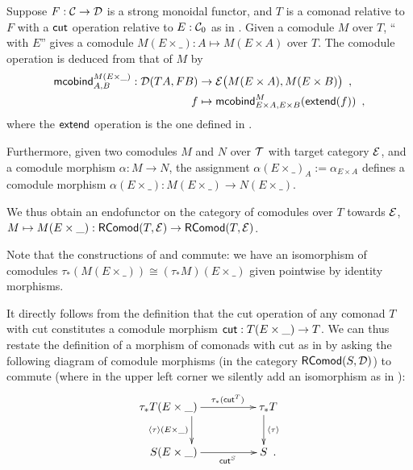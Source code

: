 \documentclass[envcountsame]{llncs}
\begin{document}
\begin{definition}%
\label{def:product_in_context}
 Suppose $F:{\mathcal{C}}\to\mathcal{D}$ is a strong monoidal functor, and $T$ is a comonad relative to $F$ with a $\mathsf{cut}$ operation 
 relative to $E:{\mathcal{C}}_0$ as in .
 Given a comodule $M$ over $T$,   \enquote{ with $E$}
 gives a comodule $M(E\times\_) : A \mapsto M(E\times A) $ over $T$.
 The comodule operation is deduced from that of $M$ by 
 \begin{align*} \mathsf{mcobind}^{M(E\times\_)}_{A,B} : \mathcal{D}(TA,FB)&\to \mathcal{E}\bigl(M(E\times A), M(E\times B)\bigr) \enspace ,\\ 
                                                      f &\mapsto \mathsf{mcobind}^M_{E\times A,E\times B}(\mathsf{extend}(f)) \enspace ,
  \end{align*}                                        
where the $\mathsf{extend}$ operation is the one defined in .
 
 Furthermore, given two comodules $M$ and $N$ over $\mathcal{T}$ with target category $\mathcal{E}$, and a comodule morphism $\alpha : M \to N$,  
 the assignment $ \alpha(E \times \_)_A := \alpha_{E\times A}$ defines a comodule morphism 
  $\alpha(E\times \_) : M(E\times \_) \to N(E\times \_) $.

\begin{Long}
  \noindent
  We thus obtain an endofunctor on the category of comodules over $T$ towards $\mathcal{E}$,
   $ M \mapsto  M (E\times \_) : \mathsf{RComod}(T,\mathcal{E}) \to \mathsf{RComod}(T,\mathcal{E})$.
\end{Long}
\end{definition}



\begin{remark}\label{rem:prod_pullback_commute}
 Note that the constructions of  and  commute:
 we have an isomorphism of comodules 
  $\tau_*(M(E\times \_)) \cong (\tau_*M)(E \times \_)$
 given pointwise by identity morphisms.
\end{remark}


\begin{Long}

It directly follows from the definition that the cut operation of any comonad $T$ with cut 
constitutes a comodule morphism $\mathsf{cut} : T(E\times \_) \to T$.
We can thus restate the definition of a morphism of comonads with cut as in  by asking the following diagram 
of comodule morphisms (in the category $\mathsf{RComod}(S,\mathcal{D})$) to commute
(where in the upper left corner we silently add an isomorphism as in ):
 \[ \begin{xy}
       \xymatrix{  **[l] \tau_*T(E\times \_ )  \ar[r]^{\tau_*(\cut^T)} \ar[d]_{\induced{\tau}(E\times \_)}  &  **[r] \tau_*T \ar[d]^{\induced{\tau}} \\
                   **[l]  S (E\times \_ ) \ar[r]_{\cut^S}  &  **[r] S  \enspace .
        }
      \end{xy}
   \]

\end{Long}
\end{document}
